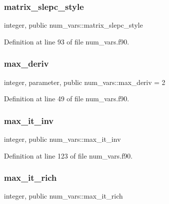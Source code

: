 \subsubsection{\texorpdfstring{matrix\+\_\+slepc\+\_\+style}{matrix\_slepc\_style}}
{\footnotesize\ttfamily integer, public num\+\_\+vars\+::matrix\+\_\+slepc\+\_\+style}



Definition at line 93 of file num\+\_\+vars.\+f90.

\mbox{\label{namespacenum__vars_a78f5aeea9d9c2f41e388bfcef9021e64}} 
\subsubsection{\texorpdfstring{max\+\_\+deriv}{max\_deriv}}
{\footnotesize\ttfamily integer, parameter, public num\+\_\+vars\+::max\+\_\+deriv = 2}



Definition at line 49 of file num\+\_\+vars.\+f90.

\mbox{\label{namespacenum__vars_a5a210aad14931202fd7b445852f17e06}} 
\subsubsection{\texorpdfstring{max\+\_\+it\+\_\+inv}{max\_it\_inv}}
{\footnotesize\ttfamily integer, public num\+\_\+vars\+::max\+\_\+it\+\_\+inv}



Definition at line 123 of file num\+\_\+vars.\+f90.

\mbox{\label{namespacenum__vars_afbd4cb9a4ef9e8a277aecfc41b09aa1d}} 
\subsubsection{\texorpdfstring{max\+\_\+it\+\_\+rich}{max\_it\_rich}}
{\footnotesize\ttfamily integer, public num\+\_\+vars\+::max\+\_\+it\+\_\+rich}



